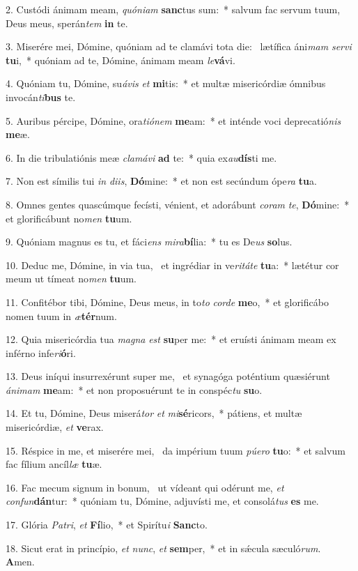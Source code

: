 2. Custódi ánimam meam, \textit{quón}\textit{i}\textit{am} \textbf{sanc}tus sum:~*  salvum fac servum tuum, Deus meus, sperán\textit{tem} \textbf{in} te.\

3. Miserére mei, Dómine, quóniam ad te clamávi tota die: \dag\  lætífica áni\textit{mam} \textit{ser}\textit{vi} \textbf{tu}i,~*  quóniam ad te, Dómine, ánimam meam \textit{le}\textbf{vá}vi.\

4. Quóniam tu, Dómine, su\textit{á}\textit{vis} \textit{et} \textbf{mi}tis:~*  et multæ misericórdiæ ómnibus invocán\textit{ti}\textbf{bus} te.\

5. Auribus pércipe, Dómine, ora\textit{ti}\textit{ó}\textit{nem} \textbf{me}am:~*  et inténde voci deprecatió\textit{nis} \textbf{me}æ.\

6. In die tribulatiónis meæ \textit{cla}\textit{má}\textit{vi} \textbf{ad} te:~*  quia ex\textit{au}\textbf{dís}ti me.\

7. Non est símilis tui \textit{in} \textit{di}\textit{is}, \textbf{Dó}mine:~*  et non est secúndum ópe\textit{ra} \textbf{tu}a.\

8. Omnes gentes quascúmque fecísti, vénient, et adorábunt \textit{co}\textit{ram} \textit{te}, \textbf{Dó}mine:~*  et glorificábunt no\textit{men} \textbf{tu}um.\

9. Quóniam magnus es tu, et fáci\textit{ens} \textit{mi}\textit{ra}\textbf{bí}lia:~*  tu es De\textit{us} \textbf{so}lus.\

10. Deduc me, Dómine, in via tua, \dag\  et ingrédiar in ve\textit{ri}\textit{tá}\textit{te} \textbf{tu}a:~*  lætétur cor meum ut tímeat no\textit{men} \textbf{tu}um.\

11. Confitébor tibi, Dómine, Deus meus, in to\textit{to} \textit{cor}\textit{de} \textbf{me}o,~*  et glorificábo nomen tuum in \textit{æ}\textbf{tér}num.\

12. Quia misericórdia tua \textit{ma}\textit{gna} \textit{est} \textbf{su}per me:~*  et eruísti ánimam meam ex inférno infe\textit{ri}\textbf{ó}ri.\

13. Deus iníqui insurrexérunt super me, \dag\  et synagóga poténtium quæsiérunt \textit{á}\textit{ni}\textit{mam} \textbf{me}am:~*  et non proposuérunt te in conspéc\textit{tu} \textbf{su}o.\

14. Et tu, Dómine, Deus miserá\textit{tor} \textit{et} \textit{mi}\textbf{sé}ricors,~*  pátiens, et multæ misericórdiæ, \textit{et} \textbf{ve}rax.\

15. Réspice in me, et miserére mei, \dag\  da impérium tuum \textit{pú}\textit{e}\textit{ro} \textbf{tu}o:~*  et salvum fac fílium ancíl\textit{læ} \textbf{tu}æ.\

16. Fac mecum signum in bonum, \dag\  ut vídeant qui odérunt me, \textit{et} \textit{con}\textit{fun}\textbf{dán}tur:~*  quóniam tu, Dómine, adjuvísti me, et consolá\textit{tus} \textbf{es} me.\

17. Glória \textit{Pa}\textit{tri}, \textit{et} \textbf{Fí}lio,~*  et Spirítu\textit{i} \textbf{Sanc}to.\

18. Sicut erat in princípio, \textit{et} \textit{nunc}, \textit{et} \textbf{sem}per,~*  et in sǽcula sæculó\textit{rum}. \textbf{A}men.\

